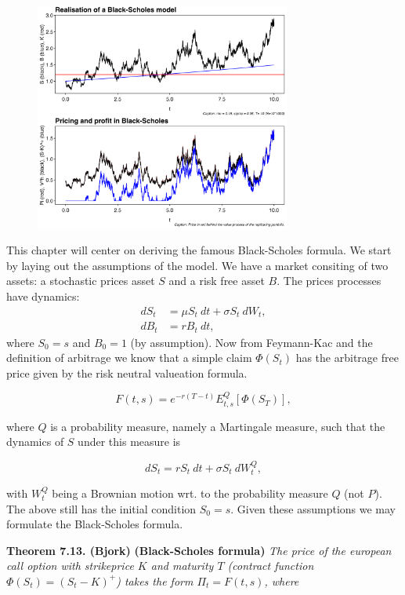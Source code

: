\documentclass[
]{book}
\begin{document}
\begin{figure}[H]
  \begin{center}
    \includegraphics[width=0.75\textwidth]{figures/BS_sim.png}
  \end{center}
\end{figure}

This chapter will center on deriving the famous Black-Scholes formula. We start by laying out the assumptions of the model. We have a market consiting of two assets: a stochastic prices asset \(S\) and a risk free asset \(B\). The prices processes have dynamics:
\begin{align*}
dS_t&=\mu S_t\ dt+\sigma S_t\ dW_t,\tag{7.45}\\
dB_t&=r B_t\ dt,\tag{7.44}
\end{align*}
where \(S_0=s\) and \(B_0=1\) (by assumption). Now from Feymann-Kac and the definition of arbitrage we know that a simple claim \(\Phi(S_t)\) has the arbitrage free price given by the risk neutral valueation formula.

\[
F(t,s)=e^{-r(T-t)}E^Q_{t,s}[\Phi(S_T)],\tag{7.46}
\]

where \(Q\) is a probability measure, namely a Martingale measure, such that the dynamics of \(S\) under this measure is

\[
dS_t=r S_t\ dt+\sigma S_t\ dW^Q_t,\tag{7.47}
\]

with \(W_t^Q\) being a Brownian motion wrt. to the probability measure \(Q\) (not \(P\)). The above still has the initial condition \(S_0=s\). Given these assumptions we may formulate the Black-Scholes formula.

\textbf{Theorem 7.13. (Bjork)} \textbf{(Black-Scholes formula)} \emph{The price of the european call option with strikeprice \(K\) and maturity \(T\) (contract function \(\Phi(S_t)=\left( S_t - K\right)^+\)) takes the form \(\Pi_t=F(t,s)\), where}
\end{document}
